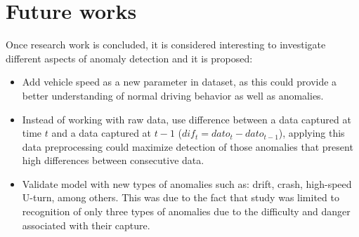 \section{Future works}

Once research work is concluded, it is considered interesting to investigate different aspects of anomaly detection and it is proposed:

\begin{itemize}
\item Add vehicle speed as a new parameter in dataset, as this could provide a better understanding of normal driving behavior as well as anomalies.
\item Instead of working with raw data, use difference between a data captured at time $t$ and a data captured at $t-1$ ($dif_{t} = dato_{t}-dato_{t-1}$), applying this data preprocessing could maximize detection of those anomalies that present high differences between consecutive data.
\item Validate model with new types of anomalies such as: drift, crash, high-speed U-turn, among others. This was due to the fact that study was limited to recognition of only three types of anomalies due to the difficulty and danger associated with their capture.

\end{itemize}
